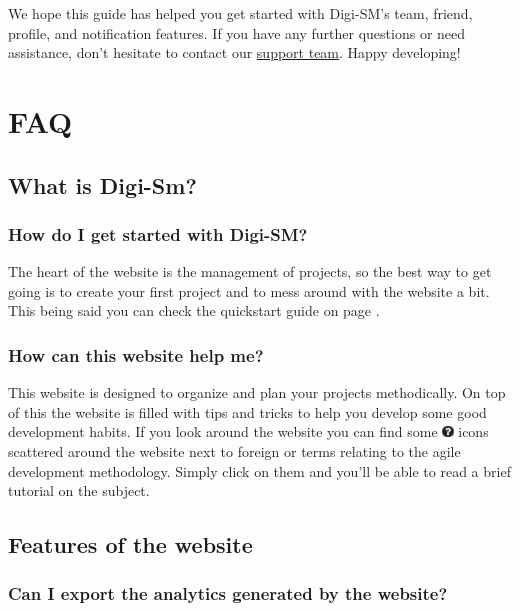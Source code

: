 \documentclass{article}
\begin{document}
We hope this guide has helped you get started with Digi-SM's team, friend, profile, and notification features. If you have any further questions or need assistance, don't hesitate to contact our \hyperref[sec:ContactInfo]{support team}. Happy developing!

\newpage

\section{FAQ}

\subsection{What is Digi-Sm?}

\subsubsection{How do I get started with Digi-SM?}

The heart of the website is the management of projects, so the best way to get going is to create your first project and to mess around with the website a bit.
This being said you can check the quickstart guide on page \pageref{quickstart}.


\subsubsection{How can this website help me?}

This website is designed to organize and plan your projects methodically. On top of this the website is filled with tips and tricks to help you develop some good development habits. If you look around the website you can find some \includegraphics[width=0.3cm]{questionMark.png} icons scattered around the website next to foreign or terms relating to the agile development methodology. Simply click on them and you'll be able to read a brief tutorial on the subject.

\subsection{Features of the website}

\subsubsection{Can I export the analytics generated by the website?}
\end{document}
